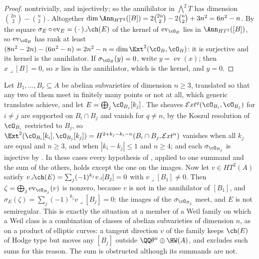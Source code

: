 \begin{proof}
nontrivially, and injectively; so the annihilator in
${\textstyle\bigwedge^{2}}T$ has dimension $\binom{2n}{2}-\binom{n}{2}$.
Altogether $\dim\Ann_{HT^{2}}([B])=2\binom{2n}{2}-2\binom{n}{2}+3n^{2}
=6n^{2}-n$. By the square $\sigma_{E}\circ\operatorname{ev}_{E}=
(\,\cdot\,)\lrcorner\ch(E)$ of  the kernel of
$\operatorname{ev}_{\cO_{B}}$ lies in $\Ann_{HT^{2}}([B])$, so
$\operatorname{ev}_{\cO_{B}}$ has rank at least $(8n^{2}-2n)-(6n^{2}-n)
=2n^{2}-n=\dim\Ext^{2}(\cO_{B},\cO_{B})$: it is surjective and its kernel is
the annihilator. If $\sigma_{\cO_{B}}(y)=0$, write $y=\operatorname{ev}(x)$;
then $x\lrcorner[B]=0$, so $x$ lies in the annihilator, which is the kernel,
and $y=0$.
\end{proof}

\begin{remark}\label{rem:absums}
Let $B_{1},\dots,B_{r}\subseteq A$ be abelian subvarieties of dimension
$n\ge3$, translated so that any two of them meet in finitely many points or
not at all, which generic translates achieve, and let $E=\bigoplus_{j}
\cO_{B_{j}}[k_{j}]$. The sheaves $\mathcal{E}xt^{q}(\cO_{B_{i}},\cO_{B_{j}})$
for $i\ne j$ are supported on $B_{i}\cap B_{j}$ and vanish for $q\ne n$,
by the Koszul resolution of $\cO_{B_{i}}$ restricted to $B_{j}$, so
$\Ext^{2}(\cO_{B_{i}}[k_{i}],\cO_{B_{j}}[k_{j}])=H^{2+k_{j}-k_{i}-n}
(B_{i}\cap B_{j},\mathcal{E}xt^{n})$ vanishes when all $k_{j}$ are equal and
$n\ge3$, and when $|k_{i}-k_{j}|\le1$ and $n\ge4$; and each
$\sigma_{\cO_{B_{j}}}$ is injective by . In these cases
every hypothesis of , applied to one summand and the
sum of the others, holds except the one on the images. Now let $v\in HT^{2}(A)$
satisfy $v\lrcorner\ch(E)=\sum_{j}(-1)^{k_{j}}v\lrcorner[B_{j}]=0$ with
$v\lrcorner[B_{1}]\ne0$. Then $\zeta=\bigoplus_{j}\operatorname{ev}_{\cO_{B_{j}}}(v)$
is nonzero, because $v$ is not in the annihilator of $[B_{1}]$, and
$\sigma_{E}(\zeta)=\sum_{j}(-1)^{k_{j}}v\lrcorner[B_{j}]=0$: the images of
the $\sigma_{\cO_{B_{j}}}$ meet, and $E$ is not semiregular. This is exactly
the situation at a member of a Weil family on which a Weil class is a
combination of classes of abelian subvarieties of dimension $n$, as on a
product of elliptic curves: a tangent direction $v$ of the family keeps
$\ch(E)$ of Hodge type but moves any $[B_{j}]$ outside
$\QQ\theta^{n}\oplus\HW(A)$, and  excludes such sums
for this reason. The sum is obstructed although its summands are not.
\end{remark}

